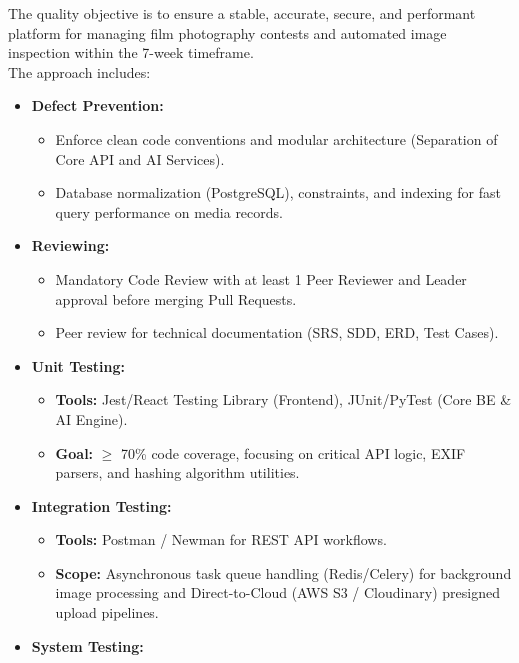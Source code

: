 The quality objective is to ensure a stable, accurate, secure, and performant platform for managing film photography contests and automated image inspection within the 7-week timeframe.\\
The approach includes:
\begin{itemize}[leftmargin=*, itemsep=0.5em]
    \item \textbf{Defect Prevention:}
    \begin{itemize}[label={-}, leftmargin=1.5em, itemsep=0.2em]
        \item Enforce clean code conventions and modular architecture (Separation of Core API and AI Services).
        \item Database normalization (PostgreSQL), constraints, and indexing for fast query performance on media records.
    \end{itemize}
    \item \textbf{Reviewing:}
    \begin{itemize}[label={-}, leftmargin=1.5em, itemsep=0.2em]
        \item Mandatory Code Review with at least 1 Peer Reviewer and Leader approval before merging Pull Requests.
        \item Peer review for technical documentation (SRS, SDD, ERD, Test Cases).
    \end{itemize}
    \item \textbf{Unit Testing:}
    \begin{itemize}[label={-}, leftmargin=1.5em, itemsep=0.2em]
        \item \textbf{Tools:} Jest/React Testing Library (Frontend), JUnit/PyTest (Core BE \& AI Engine).
        \item \textbf{Goal:} $\geq$ 70\% code coverage, focusing on critical API logic, EXIF parsers, and hashing algorithm utilities.
    \end{itemize}
    \item \textbf{Integration Testing:}
    \begin{itemize}[label={-}, leftmargin=1.5em, itemsep=0.2em]
        \item \textbf{Tools:} Postman / Newman for REST API workflows.
        \item \textbf{Scope:} Asynchronous task queue handling (Redis/Celery) for background image processing and Direct-to-Cloud (AWS S3 / Cloudinary) presigned upload pipelines.
    \end{itemize}
    \item \textbf{System Testing:}

\end{itemize}
